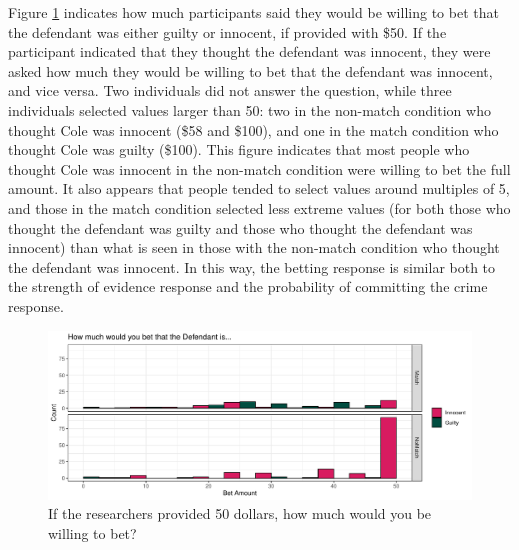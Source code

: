 \documentclass[print]{nuthesis}
\begin{document}
Figure \ref{fig:betting} indicates how much participants said they would be willing to bet that the defendant was either guilty or innocent, if provided with \$50.
If the participant indicated that they thought the defendant was innocent, they were asked how much they would be willing to bet that the defendant was innocent, and vice versa.
Two individuals did not answer the question, while three individuals selected values larger than 50: two in the non-match condition who thought Cole was innocent (\$58 and \$100), and one in the match condition who thought Cole was guilty (\$100).
This figure indicates that most people who thought Cole was innocent in the non-match condition were willing to bet the full amount.
It also appears that people tended to select values around multiples of 5, and those in the match condition selected less extreme values (for both those who thought the defendant was guilty and those who thought the defendant was innocent) than what is seen in those with the non-match condition who thought the defendant was innocent.
In this way, the betting response is similar both to the strength of evidence response and the probability of committing the crime response.

\begin{figure}

{\centering \includegraphics[width=\linewidth]{thesis_files/figure-latex/betting-1} 

}

\caption{If the researchers provided 50 dollars, how much would you be willing to bet?}\label{fig:betting}
\end{figure}
\end{document}
